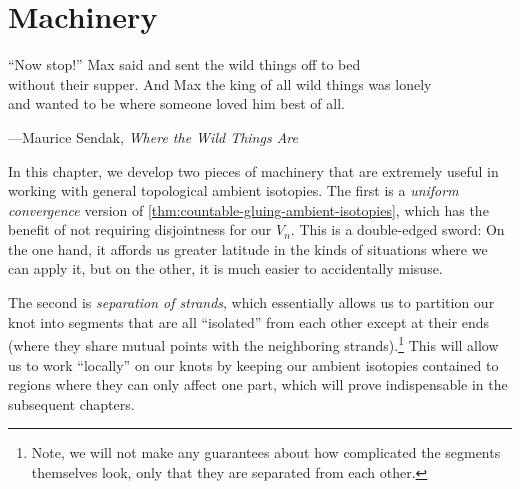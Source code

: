 \chapter{Machinery}\label{chap:machinery}
\setlength{}
\epigraph{``Now stop!'' Max said and sent the wild things off to bed\\
  without their supper. And Max the king of all wild things was lonely\\
  and wanted to be where someone loved him best of all.}{---Maurice
  Sendak, \emph{Where the Wild Things Are}}

In this chapter, we develop two pieces of machinery that are extremely
useful in working with general topological ambient isotopies. The
first is a \emph{uniform convergence} version of
\cref{thm:countable-gluing-ambient-isotopies}, which has the benefit
of not requiring disjointness for our $V_n$. This is a double-edged
sword: On the one hand, it affords us greater latitude in the kinds of
situations where we can apply it, but on the other, it is much easier
to accidentally misuse.

The second is \emph{separation of strands}, which essentially allows
us to partition our knot into segments that are all ``isolated'' from
each other except at their ends (where they share mutual points with
the neighboring strands).\footnote{Note, we will not make any
  guarantees about how complicated the segments themselves look, only
  that they are separated from each other.} This will allow us to work
``locally'' on our knots by keeping our ambient isotopies contained to
regions where they can only affect one part, which will prove
indispensable in the subsequent chapters.




